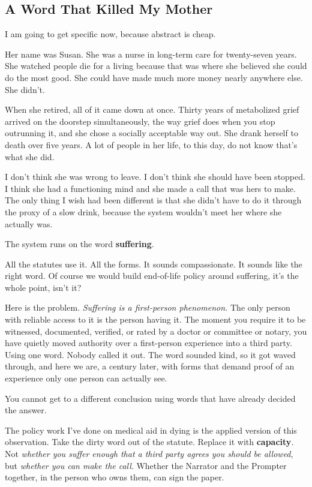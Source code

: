 \documentclass[11pt, letterpaper]{article}
\newcommand{\vocab}[1]{\textbf{\textcolor{meatred}{#1}}}
\begin{document}
\subsection{A Word That Killed My Mother}

I am going to get specific now, because abstract is cheap.

Her name was Susan. She was a nurse in long-term care for twenty-seven years. She watched people die for a living because that was where she believed she could do the most good. She could have made much more money nearly anywhere else. She didn't.

When she retired, all of it came down at once. Thirty years of metabolized grief arrived on the doorstep simultaneously, the way grief does when you stop outrunning it, and she chose a socially acceptable way out. She drank herself to death over five years. A lot of people in her life, to this day, do not know that's what she did.

I don't think she was wrong to leave. I don't think she should have been stopped. I think she had a functioning mind and she made a call that was hers to make. The only thing I wish had been different is that she didn't have to do it through the proxy of a slow drink, because the system wouldn't meet her where she actually was.

The system runs on the word \vocab{suffering}.

All the statutes use it. All the forms. It sounds compassionate. It sounds like the right word. Of course we would build end-of-life policy around suffering, it's the whole point, isn't it?

Here is the problem. \textit{Suffering is a first-person phenomenon.} The only person with reliable access to it is the person having it. The moment you require it to be witnessed, documented, verified, or rated by a doctor or committee or notary, you have quietly moved authority over a first-person experience into a third party. Using one word. Nobody called it out. The word sounded kind, so it got waved through, and here we are, a century later, with forms that demand proof of an experience only one person can actually see.

You cannot get to a different conclusion using words that have already decided the answer.

The policy work I've done on medical aid in dying is the applied version of this observation. Take the dirty word out of the statute. Replace it with \vocab{capacity}. Not \textit{whether you suffer enough that a third party agrees you should be allowed}, but \textit{whether you can make the call}. Whether the Narrator and the Prompter together, in the person who owns them, can sign the paper.
\end{document}

